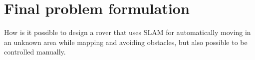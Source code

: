 \chapter{Final problem formulation}\label{ch:finalproblem}

How is it possible to design a rover that uses SLAM for automatically moving in an unknown area while mapping and avoiding obstacles, but also possible to be controlled manually.








